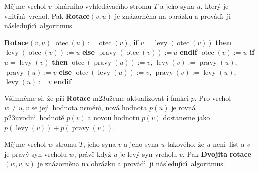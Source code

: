 \documentclass[a4paper,12pt]{article}
\DeclareMathOperator*{\otec}{otec}
\DeclareMathOperator*{\levy}{levy}
\DeclareMathOperator*{\pravy}{pravy}
\begin{document}
\flushpar M\v ejme vrchol $v$ bin\'arn\'\i ho vyhled\'avac\'\i ho stromu $
T$ a 
jeho syna $u$, kter\'y je vnit\v rn\'\i\ vrchol.  Pak {\bf Rotace$
(v,u)$} je 
zn\'azorn\v ena na obr\'azku a prov\'ad\'\i\ ji n\'asleduj\'\i c\'\i\ algoritmus.  
\bigskip

\midinsert
\centerline{}
\endcaption
\endinsert
\medskip

{\bf Rotace$(v,u)$\newline} 
$\otec(u):=\otec(v)$,\newline 
{\bf if} $v=\levy(\otec(v))$ {\bf then}\newline 
\phantom{---}$\levy(\otec(v)):=u$\newline 
{\bf else}\newline 
\phantom{---}$\pravy(\otec(v)):=u$\newline 
{\bf endif\newline 
$\otec(v):=u$\newline 
if} $u=\levy(v)$ {\bf then}\newline 
\phantom{---}$\otec(\pravy(u)):=v$, $\levy(v):=\pravy(u)$, $\pravy(u):=v$\newline 
{\bf else}\newline 
\phantom{---}$\otec(\levy(u)):=v$, $\pravy(v):=\levy(u)$, $\levy(u):=v$\newline 
{\bf endif}
\medskip

\flushpar V\v simn\v eme si, \v ze p\v ri {\bf Rotace} m\accent23u\v zeme 
aktualizovat i funkci $p$. Pro vrchol $w\ne u,v$ se jej\'\i\ hodnota 
nem\v en\'\i , nov\'a hodnota $p(u)$ je rovn\'a p\accent23uvodn\'\i\ hodnot\v e 
$p(v)$ a novou hodnotu $p(v)$ dostaneme jako 
$p(\levy(v))+p(\pravy(v))$.
\medskip

\flushpar M\v ejme vrchol $w$ stromu $T$, jeho syna $v$ a jeho 
syna $u$ takov\'eho, \v ze $u$ nen\'\i\ list a $v$ je prav\'y syn 
vrcholu $w$, pr\'av\v e kdy\v z $u$ je lev\'y syn vrcholu $v$. Pak 
{\bf Dvojita}-{\bf rotace$(w,v,u)$} je zn\'azorn\v ena na obr\'azku a prov\'ad\'\i\ 
ji n\'asleduj\'\i c\'\i\ algoritmus.

\midinsert
\centerline{}
\endcaption
\endinsert
\medskip
\end{document}
